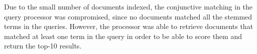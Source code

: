 Due to the small number of documents indexed, the conjunctive matching in the query processor was compromised, since no documents matched all the stemmed terms in the queries. However, the processor was able to retrieve documents that matched at least one term in the query in order to be able to score them and return the top-10 results.









